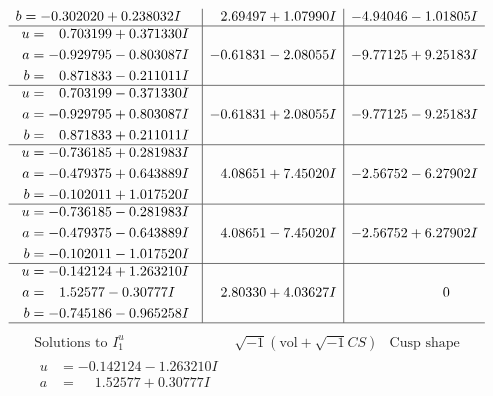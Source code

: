 \documentclass[1p]{elsarticle_modified}
\theoremstyle{definition}
\newcommand{\I}{\sqrt{-1}}
\begin{document}
$$\begin{array}{c|c|c}
\begin{aligned}
b &= -0.302020 + 0.238032 I\end{aligned}
 & \phantom{-}2.69497 + 1.07990 I & -4.94046 - 1.01805 I \\ \hline\begin{aligned}
u &= \phantom{-}0.703199 + 0.371330 I \\
a &= -0.929795 - 0.803087 I \\
b &= \phantom{-}0.871833 - 0.211011 I\end{aligned}
 & -0.61831 - 2.08055 I & -9.77125 + 9.25183 I \\ \hline\begin{aligned}
u &= \phantom{-}0.703199 - 0.371330 I \\
a &= -0.929795 + 0.803087 I \\
b &= \phantom{-}0.871833 + 0.211011 I\end{aligned}
 & -0.61831 + 2.08055 I & -9.77125 - 9.25183 I \\ \hline\begin{aligned}
u &= -0.736185 + 0.281983 I \\
a &= -0.479375 + 0.643889 I \\
b &= -0.102011 + 1.017520 I\end{aligned}
 & \phantom{-}4.08651 + 7.45020 I & -2.56752 - 6.27902 I \\ \hline\begin{aligned}
u &= -0.736185 - 0.281983 I \\
a &= -0.479375 - 0.643889 I \\
b &= -0.102011 - 1.017520 I\end{aligned}
 & \phantom{-}4.08651 - 7.45020 I & -2.56752 + 6.27902 I \\ \hline\begin{aligned}
u &= -0.142124 + 1.263210 I \\
a &= \phantom{-}1.52577 - 0.30777 I \\
b &= -0.745186 - 0.965258 I\end{aligned}
 & \phantom{-}2.80330 + 4.03627 I & \phantom{-0.000000 } 0\\
 \hline 
 \end{array}$$\newpage$$\begin{array}{c|c|c}  
\text{Solutions to }I^u_{1}& \I (\text{vol} + \sqrt{-1}CS) & \text{Cusp shape}\\
 \hline 
\begin{aligned}
u &= -0.142124 - 1.263210 I \\
a &= \phantom{-}1.52577 + 0.30777 I \\

\end{aligned}
\end{array}$$
\end{document}
